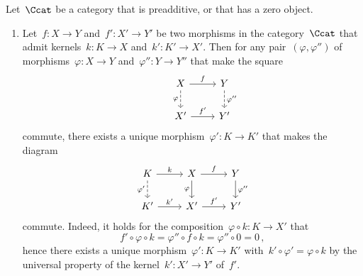 \begin{remark*}
  \label{functoriality of (co)kernel}
  Let~$\Ccat$ be a category that is preadditive, or that has a zero object.
  \begin{enumerate}
    \item
      Let~$f \colon X \to Y$ and~$f' \colon X' \to Y'$ be two morphisms in the category~$\Ccat$ that admit kernels~$k \colon K \to X$ and~$k' \colon K' \to X'$.
      Then for any pair~$(\varphi,\varphi'')$ of morphisms~$\varphi \colon X \to Y$ and~$\varphi'' \colon Y \to Y''$ that make the square
      \[
        \begin{tikzcd}
          & X
            \arrow{r}[above]{f}
            \arrow[dashed]{d}[left]{\varphi}
          & Y
            \arrow[dashed]{d}[right]{\varphi''}
          \\
          & X'
            \arrow{r}[above]{f'}
          & Y'
        \end{tikzcd}
      \]
      commute, there exists a unique morphism~$\varphi' \colon K \to K'$ that makes the diagram
      \[
        \begin{tikzcd}
            K
            \arrow{r}[above]{k}
            \arrow[dashed]{d}[left]{\varphi'}
          & X
            \arrow{r}[above]{f}
            \arrow{d}[left]{\varphi}
          & Y
            \arrow{d}[right]{\varphi''}
          \\
            K'
            \arrow{r}[above]{k'}
          & X'
            \arrow{r}[above]{f'}
          & Y'
        \end{tikzcd}
      \]
      commute.
      Indeed, it holds for the composition~$\varphi \circ k \colon K \to X'$ that
      \[
          f' \circ \varphi \circ k
        = \varphi'' \circ f \circ k
        = \varphi'' \circ 0
        = 0 \,,
      \]
      hence there exists a unique morphism~$\varphi' \colon K \to K'$ with~$k' \circ \varphi' = \varphi \circ k$ by the universal property of the kernel~$k' \colon X' \to Y'$ of~$f'$.
      

\end{enumerate}
\end{remark*}
